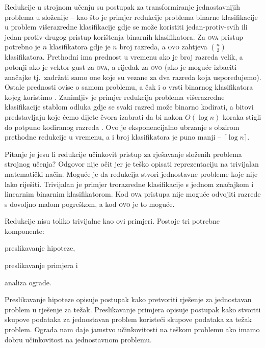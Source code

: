 Redukcije u strojnom učenju su postupak za transformiranje jednostavnijih
problema u složenije -- kao što je primjer redukcije problema binarne
klasifikacije u problem višerazredne klasifikacije gdje se može koristiti
jedan-protiv-svih  ili jedan-protiv-drugog
 pristup korištenja binarnih klasifikatora. Za
\textsc{ova} pristup potrebno je $n$ klasifikatora gdje je $n$ broj razreda, a
\textsc{ovo} zahtjeva $\binom{n}{2}$ klasifikatora. Prethodni ima prednost u
vremenu ako je broj razreda velik, a potonji ako je vektor gust za \textsc{ova},
a rijedak za \textsc{ovo} (ako je moguće izbaciti značajke tj.~zadržati samo one
koje su vezane za dva razreda koja uspoređujemo). Ostale prednosti ovise o samom
problemu, a čak i o vrsti binarnog klasifikatora kojeg koristimo
\citep{milgram2006one}. Zanimljiv je primjer redukcija problema višerazredne
klasifikacije stablom odluka  gdje se svaki razred može
binarno kodirati, a bitovi predstavljaju koje ćemo dijete čvora izabrati da bi
nakon $O(\log n)$ koraka stigli do potpuno kodiranog razreda
\citep{beygelzimer2009error, daume2016one}. Ovo je eksponencijalno ubrzanje s
obzirom prethodne redukcije u vremenu, a i broj klasifikatora je puno manji --
$\lceil \log n \rceil$.

Pitanje je jesu li redukcije učinkovit pristup za rješavanje složenih problema
strojnog učenja? Odgovor nije očit jer je teško opisati reprezentaciju na
trivijalan matematički način. Moguće je da redukcija stvori jednostavne probleme
koje nije lako riješiti. Trivijalan je primjer trorazredne klasifikacije s
jednom značajkom i linearnim binarnim klasifikatorom. Kod \textsc{ova} pristupa
nije moguće odvojiti razrede s dovoljno malom pogreškom, a kod \textsc{ovo} je
to moguće.

Redukcije nisu toliko trivijalne kao ovi primjeri. Postoje tri potrebne
komponente:
\begin{inlinelist}
  \item preslikavanje hipoteze,
  \item preslikavanje primjera i
  \item analiza ograde.
\end{inlinelist}
Preslikavanje hipoteze opisuje postupak kako pretvoriti rješenje za jednostavan
problem u rješenje za težak. Preslikavanje primjera opisuje postupak kako
stvoriti skupove podataka za jednostavan problem koristeći skupove podataka za
težak problem. Ograda nam daje jamstvo učinkovitosti na teškom problemu ako
imamo dobru učinkovitost na jednostavnom problemu.

